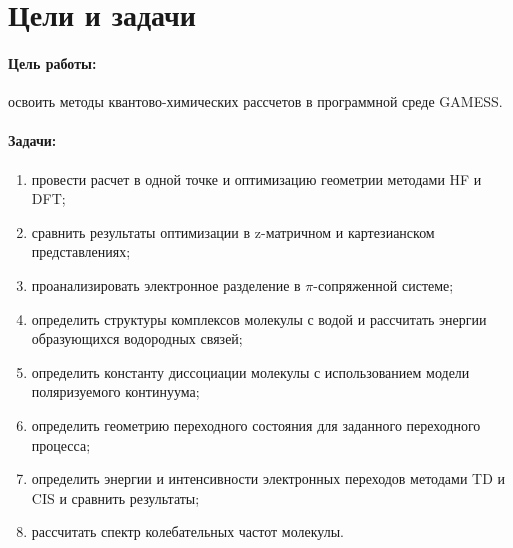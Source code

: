 \section*{Цели и задачи}
\paragraph{Цель работы:} освоить методы квантово-химических рассчетов в программной среде GAMESS.

\paragraph{Задачи:}
\begin{enumerate}
    \item провести расчет в одной точке и оптимизацию геометрии методами HF и DFT;
    \item сравнить результаты оптимизации в z-матричном и картезианском представлениях;
    \item проанализировать электронное разделение в $\pi$-сопряженной системе;
    \item определить структуры комплексов молекулы с водой и рассчитать энергии образующихся водородных связей;
    \item определить константу диссоциации молекулы с использованием модели поляризуемого континуума;
    \item определить геометрию переходного состояния для заданного переходного процесса;
    \item определить энергии и интенсивности электронных переходов методами TD и CIS и сравнить результаты;
    \item рассчитать спектр колебательных частот молекулы.
\end{enumerate}
